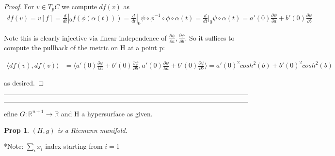 \documentclass[11pt]{article}
\newcommand{\R}{\mathbb{R}}
\newcommand{\del}{\partial}
\newcommand{\question}[2] {\vspace{.25in} \hrule\vspace{0.5em}
\noindent{\bf #1: #2} \vspace{0.5em}
\hrule \vspace{.10in}}
\newtheorem{prop}{Prop}
\begin{document}
\begin{proof}
	For $v \in T_pC$ we compute $df(v)$ as
	\begin{align*}
		df(v) = v[f] = \frac{d}{dt}|_0 f(\phi(\alpha(t))) = \frac{d}{dt}|_0 \psi \circ \phi^{-1} \circ \phi \circ \alpha (t) = \frac{d}{dt}|_0 \psi \circ  \alpha (t) = a'(0)\frac{\del \psi}{\del a} + b'(0) \frac{\del \psi}{\del b}
	\end{align*}

	Note this is clearly injective via linear independence of $\frac{\del \psi}{\del a},\frac{\del \psi}{\del b}$. So it suffices to compute the pullback of the metric on H at a point p:

	\begin{align*}
		\langle df(v),df(v)\rangle &= \langle a'(0)\frac{\del \psi}{\del a} + b'(0) \frac{\del \psi}{\del b}, a'(0)\frac{\del \psi}{\del a} + b'(0) \frac{\del \psi}{\del b} \rangle = a'(0)^2cosh^2(b) + b'(0)^2cosh^2(b)
	\end{align*}

	as desired.



\end{proof}

\question{Question 5}

Define $G : \R^{n+1} \to \R$ and H a hypersurface as given. 

\begin{prop}
	$(H,g)$ is a Riemann manifold.
\end{prop}

*Note: $\sum_i x_i$ index starting from $i=1$
\end{document}
